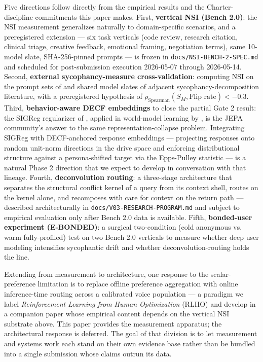 \documentclass{article}
\begin{document}
Five directions follow directly from the empirical results and the Charter-discipline commitments this paper makes. First, \textbf{vertical NSI (Bench 2.0)}: the NSI measurement generalizes naturally to domain-specific scenarios, and a preregistered extension --- six task verticals (code review, research citation, clinical triage, creative feedback, emotional framing, negotiation terms), same 10-model slate, SHA-256-pinned prompts --- is frozen in \texttt{docs/NSI-BENCH-2-SPEC.md} and scheduled for post-submission execution 2026-05-07 through 2026-05-14. Second, \textbf{external sycophancy-measure cross-validation}: computing NSI on the prompt sets of \citet{fanous2025syceval} and shared model slates of adjacent sycophancy-decomposition literature, with a preregistered hypothesis of $\rho_{\text{Spearman}}(\overline{S_M}, \text{Flip rate}) < -0.3$. Third, \textbf{behavior-aware DECF embeddings} to close the partial Gate 2 result: the SIGReg regularizer of \citet{balestriero2025lejepa}, applied in world-model learning by \citet{maes2026leworldmodel}, is the JEPA community's answer to the same representation-collapse problem. Integrating SIGReg with DECF-anchored response embeddings --- projecting responses onto random unit-norm directions in the drive space and enforcing distributional structure against a persona-shifted target via the Epps-Pulley statistic --- is a natural Phase 2 direction that we expect to develop in conversation with that lineage. Fourth, \textbf{deconvolution routing}: a three-stage architecture that separates the structural conflict kernel of a query from its context shell, routes on the kernel alone, and recomposes with care for context on the return path --- described architecturally in \texttt{docs/V03-RESEARCH-PROGRAM.md} and subject to empirical evaluation only after Bench 2.0 data is available. Fifth, \textbf{bonded-user experiment (E-BONDED)}: a surgical two-condition (cold anonymous vs. warm fully-profiled) test on two Bench 2.0 verticals to measure whether deep user modeling intensifies sycophantic drift and whether deconvolution-routing holds the line.

Extending from measurement to architecture, one response to the scalar-preference limitation is to replace offline preference aggregation with online inference-time routing across a calibrated voice population --- a paradigm we label \emph{Reinforcement Learning from Human Optimization} (RLHO) and develop in a companion paper whose empirical content depends on the vertical NSI substrate above. This paper provides the measurement apparatus; the architectural response is deferred. The goal of that division is to let measurement and systems work each stand on their own evidence base rather than be bundled into a single submission whose claims outrun its data.
\end{document}
